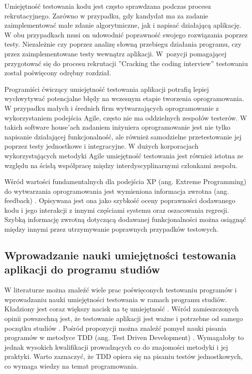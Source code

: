 Umiejętność testowania kodu jest często sprawdzana podczas procesu rekrutacyjnego.
Zarówno w przypadku, gdy kandydat ma za zadanie zaimplementować małe zdanie algorytmiczne, jak i napisać działającą aplikację.
W obu przypadkach musi on udowodnić poprawność swojego rozwiązania poprzez testy.
Niezależnie czy poprzez analizę słowną przebiegu działania programu, czy przez zaimplementowane testy wewnątrz aplikacji.
W~pozycji pomagającej przygotować się do procesu rekrutacji ”Cracking the coding interview” \cite{cracking-the-coding-interview} testowaniu został poświęcony odrębny rozdział.

Programiści ćwiczący umiejętność testowania aplikacji potrafią lepiej wychwytywać potencjalne błędy na wczesnym etapie tworzenia oprogramowania.
W przypadku małych i średnich firm wytwarzających oprogramowanie z wykorzystaniem podejścia Agile, często nie ma oddzielnych zespołów testerów.
W takich software house'ach zadaniem inżyniera oprogramowanie jest nie tylko napisanie działającej funkcjonalność, ale również samodzielne przetestowanie jej poprzez testy jednostkowe i integracyjne.
W dużych korporacjach wykorzystujących metodyki Agile umiejętność testowania jest również istotna ze względu na ścisłą współpracę między interdyscyplinarnymi członkami zespołu.

Wśród wartości fundamentalnych dla podejścia XP (ang. Extreme Programming) do wytwarzania oprogramowania jest wymieniona informacja zwrotna (ang. feedback) \cite{extreem-programming}.
Opisywana jest ona jako szybkość oceny poprawności dodawanego kodu i jego interakcji z innymi częściami systemu oraz oszacowania regresji.
Szybką informację zwrotną dotyczącą dodawanej funkcjonalności można osiągnąć między innymi przez utrzymywanie poprawnych przypadków testowych.

\subsection{Wprowadzanie nauki umiejętności testowania aplikacji do programu studiów}
\label{test_studies}

W literaturze można znaleźć wiele prac poświęconych testowaniu programów i wprowadzaniu nauki umiejętności testowania w ramach programu studiów.
Kładziony jest coraz większy nacisk na tę umiejętność \cite{tests-important}.
Wśród zamieszczonych opinii powszechną jest, że testowanie aplikacji jest ważne i potrzebne od samego początku studiów \cite{test-from-scratch}.
Pośród propozycji można znaleźć pomysł nauki pisania programów w metodyce TDD (ang. Test Driven Development) \cite{tdd-on-start}.
Wymagałoby to jednak wysokich kwalifikacji prowadzących co do znajomości metodyki i jej praktyki.
Warto zaznaczyć, że TDD opiera się na pisaniu testów jednostkowych, co wymaga wiedzy na temat programowania.

